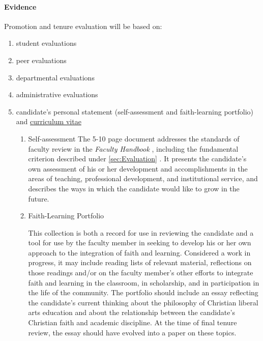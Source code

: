 			\paragraph{Evidence}
				Promotion and tenure evaluation will be based on:
				\begin{enumerate}[label=\alph*)]
					\item{student evaluations}
					\item{peer evaluations}
					\item{departmental evaluations}
					\item{administrative evaluations}
					\item{candidate's personal statement (self-assessment and faith-learning portfolio) and \underline{curriculum vitae}

						\begin{enumerate}[label=\arabic*)]
							\item{Self-assessment}
							The 5-10 page document addresses the standards of faculty review in the \emph{Faculty Handbook}
							, including the fundamental criterion described under
							\ref{sec:Evaluation}
							.  It presents the candidate's own assessment of his or her development and accomplishments in the areas of teaching, professional development, and institutional service, and describes the ways in which the candidate would like to grow in the future.
							\item{Faith-Learning Portfolio}

							This collection is both a record for use in
							reviewing the candidate and a tool for use by the
							faculty member in seeking to develop his or her own
							approach to the integration of faith and learning.
							Considered a work in progress, it may include
							reading lists of relevant material, reflections on
							those readings and/or on the faculty member's other
							efforts to integrate faith and learning in the
							classroom, in scholarship, and in participation in
							the life of the community.  The portfolio should
							include an essay reflecting the candidate's current
							thinking about the philosophy of Christian liberal
							arts education and about the relationship between
							the candidate's Christian faith and academic
							discipline.  At the time of final tenure review, the
							essay should have evolved into a  paper on
							these topics.

						\end{enumerate}
					}
				\end{enumerate}

